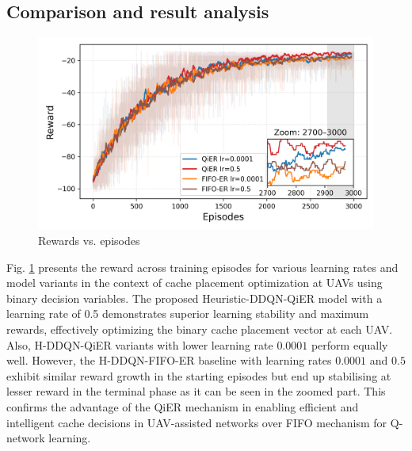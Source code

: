 \documentclass[journal]{IEEEtran}
\begin{document}
\subsection{Comparison and result analysis}
\begin{figure}[htbp]
    \centering
    \includegraphics[width=\linewidth]{MinMax Cost Scaled/reward_with_inset_zoom.png}  %
    \caption{Rewards vs. episodes}
    \label{fig:reward_vs_episodes}
\end{figure}

Fig. \ref{fig:reward_vs_episodes} presents the reward across training episodes for various learning rates and model variants in the context of cache placement optimization at UAVs using binary decision variables. The proposed Heuristic-DDQN-QiER model with a learning rate of 0.5 demonstrates superior learning stability and maximum rewards, effectively optimizing the binary cache placement vector at each UAV. Also, H-DDQN-QiER variants with lower learning rate $0.0001$ perform equally well. However, the H-DDQN-FIFO-ER baseline with learning rates $0.0001$ and $0.5$ exhibit similar reward growth in the starting episodes but end up stabilising at lesser reward in the terminal phase as it can be seen in the zoomed part. This confirms the advantage of the QiER mechanism in enabling efficient and intelligent cache decisions in UAV-assisted networks over FIFO mechanism for Q-network learning.


\end{document}
